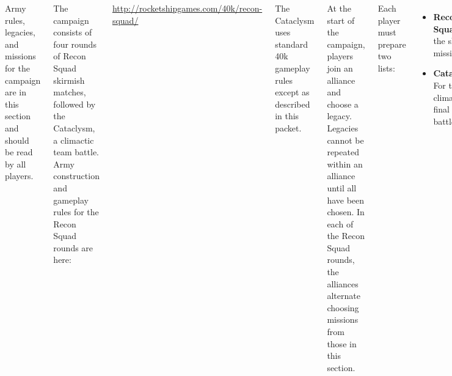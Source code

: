 \clearpage
{}

\begin{columns}
  
  Army rules, legacies, and missions for the campaign are in this
  section and should be read by all players.


The campaign consists of four rounds of Recon Squad skirmish matches,
followed by the Cataclysm, a climactic team battle.  Army construction
and gameplay rules for the Recon Squad rounds are here:

\smallskip
\centerline{\url{http://rocketshipgames.com/40k/recon-squad/}}

\smallskip%
The Cataclysm uses standard 40k gameplay rules except as described in
this packet.

At the start of the campaign, players join an alliance and choose a
legacy.  Legacies cannot be repeated within an alliance until all have
been chosen.  In each of the Recon Squad rounds, the alliances
alternate choosing missions from those in this section.


Each player must prepare two lists:

\begin{itemize}\shortlist
  \item {\bf Recon Squad:} For the skirmish missions;
  \item {\bf Cataclysm:} For the climactic final team battle.
\end{itemize}

Recon Squad lists are selected to at most~200 points, following the
rules in that packet.  Cataclysm lists are selected to at most~500
points by these rules:

  \begin{itemize}\shortlist
  \item Each player's Recon Squad list must be included in their
    Cataclysm list in its entirety.

  \item Additional units and models (with wargear and upgrades) may be
    added to the Recon Squad Detachment.  However, the original models
    may not receive new wargear or upgrades.

  \item A single Cataclysm Reinforcements Detachment may be added to
    the army, with a force organization of~0--1 HQ,~1--3 Troop,~0--1
    Elite,~0--1 Fast Attack,~0--1 Heavy Support, and~0--1
    Fortification.  All its units must be chosen from a single
    faction, but that may be a different faction from the Recon Squad
    Detachment.


\end{itemize}
\end{columns}
